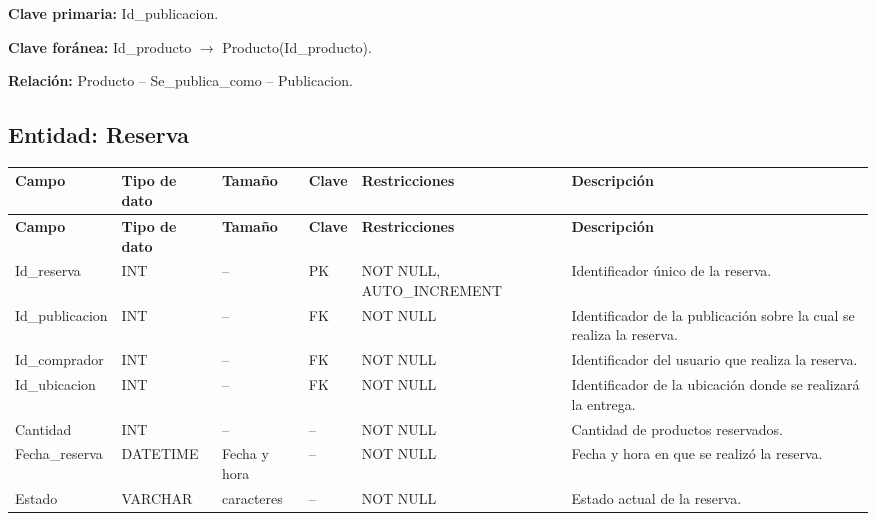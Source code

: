 \documentclass[12pt]{article} %
\begin{document}
\textbf{Clave primaria:} Id\_publicacion.

\textbf{Clave foránea:}
Id\_producto $\rightarrow$ Producto(Id\_producto).

\textbf{Relación:}
Producto -- Se\_publica\_como -- Publicacion.



\subsection{Entidad: Reserva}

\begin{longtable}{>{\raggedright\arraybackslash}p{2.5cm}
                  >{\raggedright\arraybackslash}p{2.0cm}
                  >{\raggedright\arraybackslash}p{2.2cm}
                  >{\raggedright\arraybackslash}p{1.2cm}
                  >{\raggedright\arraybackslash}p{3.0cm}
                  >{\raggedright\arraybackslash}p{4.0cm}}
\toprule
\textbf{Campo} &
\textbf{Tipo de dato} &
\textbf{Tamaño} &
\textbf{Clave} &
\textbf{Restricciones} &
\textbf{Descripción} \\
\midrule
\endfirsthead

\toprule
\textbf{Campo} &
\textbf{Tipo de dato} &
\textbf{Tamaño} &
\textbf{Clave} &
\textbf{Restricciones} &
\textbf{Descripción} \\
\midrule
\endhead

Id\_reserva &
INT &
-- &
PK &
NOT NULL, AUTO\_INCREMENT &
Identificador único de la reserva. \\

Id\_publicacion &
INT &
-- &
FK &
NOT NULL &
Identificador de la publicación sobre la cual se realiza la reserva. \\

Id\_comprador &
INT &
-- &
FK &
NOT NULL &
Identificador del usuario que realiza la reserva. \\

Id\_ubicacion &
INT &
-- &
FK &
NOT NULL &
Identificador de la ubicación donde se realizará la entrega. \\

Cantidad &
INT &
-- &
-- &
NOT NULL &
Cantidad de productos reservados. \\

Fecha\_reserva &
DATETIME &
Fecha y hora &
-- &
NOT NULL &
Fecha y hora en que se realizó la reserva. \\

Estado &
VARCHAR &
20 caracteres &
-- &
NOT NULL &
Estado actual de la reserva. \\

\bottomrule
\end{longtable}
\end{document}
